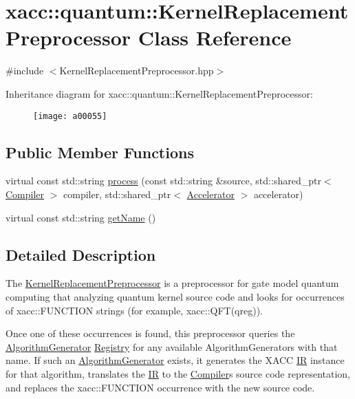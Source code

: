 \hypertarget{a00055}{}\section{xacc\+:\+:quantum\+:\+:Kernel\+Replacement\+Preprocessor Class Reference}
\label{a00055}


{\ttfamily \#include $<$Kernel\+Replacement\+Preprocessor.\+hpp$>$}

Inheritance diagram for xacc\+:\+:quantum\+:\+:Kernel\+Replacement\+Preprocessor\+:\begin{figure}[H]
\begin{center}
\leavevmode
\texttt{[image: a00055]}
\end{center}
\end{figure}
\subsection*{Public Member Functions}
\begin{DoxyCompactItemize}
\item 
virtual const std\+::string \hyperlink{a00055_ad4f9ba1f83ea45ed376f36e3853c668d}{process} (const std\+::string \&source, std\+::shared\+\_\+ptr$<$ \hyperlink{a00023}{Compiler} $>$ compiler, std\+::shared\+\_\+ptr$<$ \hyperlink{a00011}{Accelerator} $>$ accelerator)
\item 
virtual const std\+::string \hyperlink{a00055_af74db6b7f3adeb7d203777f5ce450491}{get\+Name} ()
\end{DoxyCompactItemize}


\subsection{Detailed Description}
The \hyperlink{a00055}{Kernel\+Replacement\+Preprocessor} is a preprocessor for gate model quantum computing that analyzing quantum kernel source code and looks for occurrences of \textquotesingle{}xacc\+::\+F\+U\+N\+C\+T\+I\+ON\textquotesingle{} strings (for example, xacc\+::\+Q\+F\+T(qreg)).

Once one of these occurrences is found, this preprocessor queries the \hyperlink{a00014}{Algorithm\+Generator} \hyperlink{a00071}{Registry} for any available Algorithm\+Generators with that name. If such an \hyperlink{a00014}{Algorithm\+Generator} exists, it generates the X\+A\+CC \hyperlink{a00051}{IR} instance for that algorithm, translates the \hyperlink{a00051}{IR} to the \hyperlink{a00023}{Compiler}\textquotesingle{}s source code representation, and replaces the \textquotesingle{}xacc\+::\+F\+U\+N\+C\+T\+I\+ON\textquotesingle{} occurrence with the new source code. 

